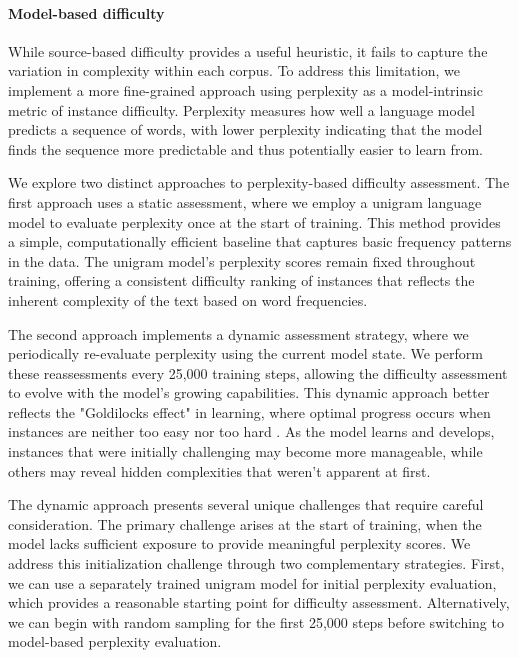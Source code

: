 \paragraph{Model-based difficulty} While source-based difficulty provides a useful heuristic, it fails to capture the variation in complexity within each corpus. To address this limitation, we implement a more fine-grained approach using perplexity as a model-intrinsic metric of instance difficulty. Perplexity measures how well a language model predicts a sequence of words, with lower perplexity indicating that the model finds the sequence more predictable and thus potentially easier to learn from.

We explore two distinct approaches to perplexity-based difficulty assessment. The first approach uses a static assessment, where we employ a unigram language model to evaluate perplexity once at the start of training. This method provides a simple, computationally efficient baseline that captures basic frequency patterns in the data. The unigram model's perplexity scores remain fixed throughout training, offering a consistent difficulty ranking of instances that reflects the inherent complexity of the text based on word frequencies.

The second approach implements a dynamic assessment strategy, where we periodically re-evaluate perplexity using the current model state. We perform these reassessments every 25,000 training steps, allowing the difficulty assessment to evolve with the model's growing capabilities. This dynamic approach better reflects the "Goldilocks effect" in learning, where optimal progress occurs when instances are neither too easy nor too hard \cite{kidd2012goldilocks}. As the model learns and develops, instances that were initially challenging may become more manageable, while others may reveal hidden complexities that weren't apparent at first.

The dynamic approach presents several unique challenges that require careful consideration. The primary challenge arises at the start of training, when the model lacks sufficient exposure to provide meaningful perplexity scores. We address this initialization challenge through two complementary strategies. First, we can use a separately trained unigram model for initial perplexity evaluation, which provides a reasonable starting point for difficulty assessment. Alternatively, we can begin with random sampling for the first 25,000 steps before switching to model-based perplexity evaluation.

